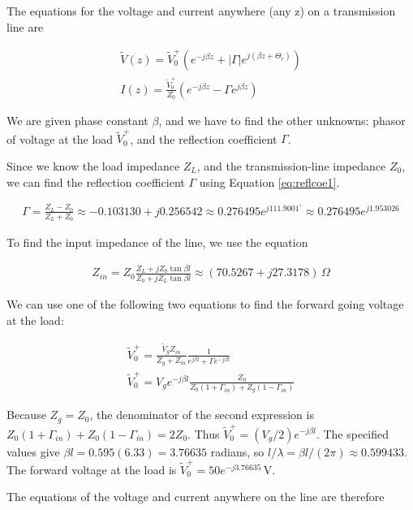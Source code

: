 \documentclass{ximera}
\begin{document}
\begin{example}
\begin{explanation}
The equations for the voltage and current anywhere (any z) on a transmission line  are


\begin{eqnarray}
\tilde{V}(z)= \tilde{V}_0^+ (e^{-j \beta z} + |\Gamma| e^{j(\beta z+\Theta_r)} ) \label{eq:vtlfin} \\
I(z)=   \frac{\tilde{V}_0^+}{Z_0}  (e^{-j \beta z} - \Gamma  e^{j \beta z}  ) \label{eq:itlfin}
\end{eqnarray}

We are given phase constant $\beta$, and we have to find the other unknowns: phasor of voltage at the load $\tilde{V}_0^+$, and the reflection coefficient $\Gamma$.    

Since we know the load impedance $Z_L$, and the transmission-line impedance $Z_0$, we can find the reflection coefficient $\Gamma$ using Equation \ref{eq:reflcoe1}.

\begin{eqnarray}
\Gamma=\frac{Z_L-Z_0}{Z_L+Z_0}
\approx-0.103130+j0.256542
\approx0.276495e^{j111.9001^\circ}
\approx0.276495e^{j1.953026} \label{eq:reflcoe1}
\end{eqnarray}

To find the input impedance of the line, we use the equation 


\begin{eqnarray}
Z_{in}= Z_0 \frac{Z_L+ j Z_0 \tan \beta l}{Z_0+ j Z_L \tan \beta l}
\approx(70.5267+j27.3178)\,\Omega
\end{eqnarray}

We can use one of the following two equations to find the forward going voltage at the load:

\begin{eqnarray}
\tilde{V}_0^+= \frac{\tilde{V}_g Z_{in}}{Z_g + Z_{in}} \frac{1}{e^{j \beta l} + \Gamma e^{-j \beta l}} \\
\tilde{V}_0^+=V_g e^{-j \beta l} \frac{Z_0}{Z_0 (1+\Gamma_{in}) +Z_g (1-\Gamma_{in})}
\end{eqnarray}

Because $Z_g=Z_0$, the denominator of the second expression is
$Z_0(1+\Gamma_{in})+Z_0(1-\Gamma_{in})=2Z_0$.
Thus $\tilde{V}_0^+=(V_g/2)e^{-j\beta l}$.
The specified values give $\beta l=0.595(6.33)=3.76635$ radians,
so $l/\lambda=\beta l/(2\pi)\approx0.599433$.
The forward voltage at the load is
$\tilde{V}_0^+=50e^{-j3.76635}\,\mathrm{V}$.



The equations of the voltage and current anywhere on the line are therefore


\end{explanation}
\end{example}
\end{document}
